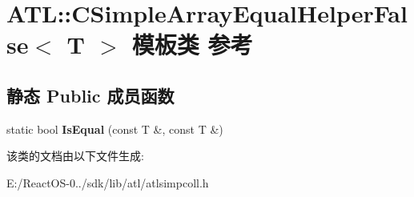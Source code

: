 \hypertarget{class_a_t_l_1_1_c_simple_array_equal_helper_false}{}\section{A\+TL\+:\+:C\+Simple\+Array\+Equal\+Helper\+False$<$ T $>$ 模板类 参考}
\label{class_a_t_l_1_1_c_simple_array_equal_helper_false}
\subsection*{静态 Public 成员函数}
\begin{DoxyCompactItemize}
\item 
\mbox{\label{class_a_t_l_1_1_c_simple_array_equal_helper_false_a4446e6b73bf55f7ef62c0a412a457124}} 
static bool {\bfseries Is\+Equal} (const T \&, const T \&)
\end{DoxyCompactItemize}


该类的文档由以下文件生成\+:\begin{DoxyCompactItemize}
\item 
E\+:/\+React\+O\+S-\/0../sdk/lib/atl/atlsimpcoll.\+h\end{DoxyCompactItemize}
